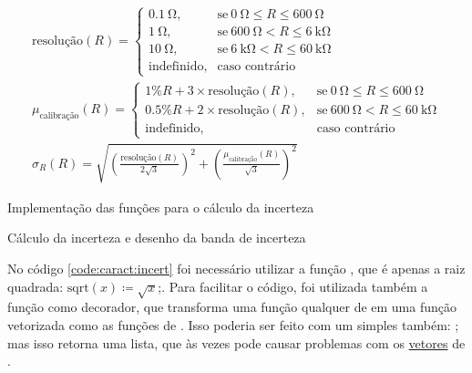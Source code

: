     \begin{eqnarray}
        \label{eq:resolucao}
        \text{resolução}(R) = \begin{cases}
            \SI{0.1}{\ohm}, & \text{se}~ \SI{0}{\ohm} \le R \le \SI{600}{\ohm} \\
            \SI{1}{\ohm},   & \text{se}~ \SI{600}{\ohm} < R \le \SI{6}{\kilo\ohm} \\
            \SI{10}{\ohm},  & \text{se}~ \SI{6}{\kilo\ohm} < R \le \SI{60}{\kilo\ohm} \\
            \text{indefinido}, & \text{caso contrário}
        \end{cases} \\%
        \label{eq:calibracao}
        \mu_\text{calibração}(R) = \begin{cases}
            1\% R + 3 \times \text{resolução}(R),   & \text{se}~ \SI{0}{\ohm} \le R \le \SI{600}{\ohm} \\
            0.5\% R + 2 \times \text{resolução}(R), & \text{se}~ \SI{600}{\ohm} < R \le \SI{60}{\kilo\ohm} \\
            \text{indefinido}, & \text{caso contrário}
        \end{cases} \\%
        \label{eq:incerteza}
        \sigma_R(R) = \sqrt{\left(\frac{\text{resolução}(R)}{2 \sqrt{3}} \right)^2 + \left(\frac{\mu_\text{calibração}(R)}{\sqrt{3}} \right)^2}
    \end{eqnarray}

    \begin{listing}[H]
        \caption{Implementação das funções para o cálculo da incerteza}
        \label{code:caract:incert}

    \end{listing}

    \begin{listing}[H]
        \caption{Cálculo da incerteza e desenho da banda de incerteza}
        \label{code:caract:bandas}

    \end{listing}

    No código \ref{code:caract:incert} foi necessário utilizar a função , que é apenas a raiz quadrada: $\text{sqrt}(x) \coloneqq \sqrt{x}$;. Para facilitar o código, foi utilizada também a função  como decorador, que transforma uma função qualquer de \python em uma função vetorizada como as funções de \numpy. Isso poderia ser feito com um simples  também: ; mas isso retorna uma lista, que às vezes pode causar problemas com os \href{https://docs.scipy.org/doc/numpy/reference/arrays.html}{vetores} de \numpy.

